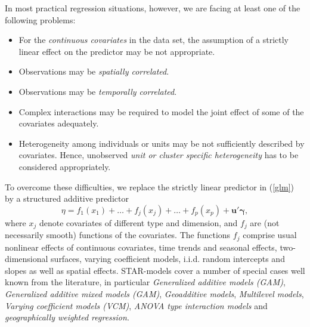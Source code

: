 \documentclass[11pt,a4paper,twoside]{bayesxarticle}
\def \gammavec {\boldsymbol{\gamma}}
\def \uvec {\mathbf{u}}
\begin{document}
In most practical regression situations, however, we are facing at
least one of the following problems:
\begin{itemize}
\item For the {\em continuous covariates} in the data set, the assumption of a strictly linear
effect on the predictor may be not appropriate. \vspace{-0.2cm}
\item Observations may be {\em spatially correlated}.
\vspace{-0.2cm}
\item Observations may be {\em temporally correlated}.
\vspace{-0.2cm}
\item Complex interactions may be required to model the joint effect
of some of the covariates adequately. \vspace{-0.2cm}
\item  Heterogeneity among individuals or units may be not sufficiently described by covariates. Hence,
unobserved {\em unit or cluster specific heterogeneity} has to be
considered appropriately.
\end{itemize}
To overcome these difficulties, we replace the strictly linear
predictor in (\ref{glm}) by a structured additive predictor
\begin{equation}
\label{gampred} \eta=f_{1}(x_{1})+\ldots+f_j(x_j) +
\ldots+f_{p}(x_{p})+\uvec'\gammavec,
\end{equation}
where $x_j$ denote
covariates of different type and dimension, and $f_j$ are (not
necessarily smooth) functions of the covariates. The functions $f_j$
comprise usual nonlinear effects of continuous covariates, time
trends and seasonal effects, two-dimensional surfaces, varying
coefficient models, i.i.d. random intercepts and slopes as well as
spatial effects. STAR-models cover a number of special cases
well known from the literature, in particular {\em Generalized additive models (GAM)},
{\em Generalized additive mixed models (GAM)}, {\em Geoadditive models}, {\em Multilevel models},
{\em Varying coefficient models (VCM)}, {\em ANOVA type interaction models} and {\em geographically weighted regression}.
\end{document}
